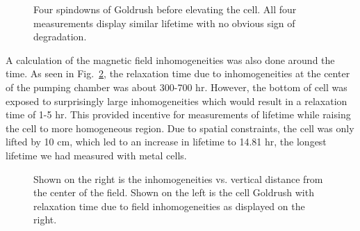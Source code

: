 \begin{figure}[t!]
	\centering
	\caption{{Four spindowns of Goldrush before elevating the cell. All four measurements display similar lifetime with no obvious sign of degradation.}}
	\label{goldrush}
\end{figure}

A calculation of the magnetic field inhomogeneities was also done around the time. As seen in Fig.~\ref{goldrush_inhomogeneities}, the relaxation time due to inhomogeneities at the center of the pumping chamber was about 300-700 hr. However, the bottom of cell was exposed to surprisingly large inhomogeneities which would result in a relaxation time of 1-5 hr. This provided incentive for measurements of lifetime while raising the cell to more homogeneous region. Due to spatial constraints, the cell was only lifted by 10 cm, which led to an increase in lifetime to 14.81 hr, the longest lifetime we had measured with metal cells.

\begin{figure}[t!]
	\centering
	\caption{{Shown on the right is the inhomogeneities vs. vertical distance from the center of the field. Shown on the left is the cell Goldrush with relaxation time due to field inhomogeneities as displayed on the right.}}
	\label{goldrush_inhomogeneities}
\end{figure}

